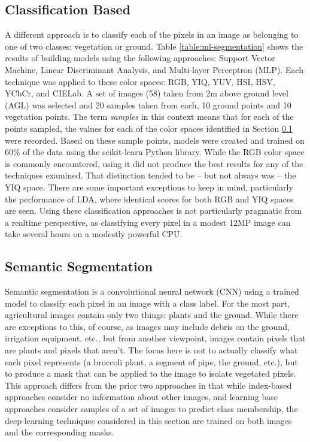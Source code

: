 \documentclass[agriculture,article,submit,pdftex,moreauthors]{Definitions/mdpi}
\begin{document}
\subsection{Classification Based}
\label{section:classification}
A different approach is to classify each of the pixels in an image as belonging to one of two classes: vegetation or ground. Table \ref{table:ml-segmentation} shows the results of building models using the following approaches:  Support Vector Machine, Linear Discriminant Analysis, and Multi-layer Perceptron (MLP). Each technique was applied to these color spaces: RGB, YIQ, YUV, HSI, HSV, YCbCr, and CIELab. A set of images (58) taken from 2m above ground level (AGL) was selected and 20 samples taken from each, 10 ground points and 10 vegetation points. The term \textit{samples} in this context means that for each of the points sampled, the values for each of the color spaces identified in Section \ref{section:classification} were recorded. Based on these sample points, models were created and trained on 60\% of the data using the scikit-learn Python library. While the RGB color space is commonly encountered, using it did not produce the best results for any of the techniques examined. That distinction tended to be -- but not always was -- the YIQ space. There are some important exceptions to keep in mind, particularly the performance of LDA, where identical scores for both RGB and YIQ spaces are seen. Using these classification approaches is not particularly pragmatic from a realtime perspective, as classifying every pixel in a modest 12MP image can take several hours on a modestly powerful CPU.



\subsection{Semantic Segmentation}
Semantic segmentation is a convolutional neural network (CNN) using a trained model to classify each pixel in an image with a class label.  For the most part, agricultural images contain only two things: plants and the ground. While there are exceptions to this, of course, as images may include debris on the ground, irrigation equipment, etc., but from another viewpoint, images contain pixels that are plants and pixels that aren't.  The focus here is not to actually classify what each pixel represents (a broccoli plant, a segment of pipe, the ground, etc.), but to produce a mask that can be applied to the image to isolate vegetated pixels. This approach differs from the prior two approaches in that while index-based approaches consider no information about other images, and learning base approaches consider samples of a set of images to predict class membership, the deep-learning techniques considered in this section are trained on both images and the corresponding masks.
\end{document}
